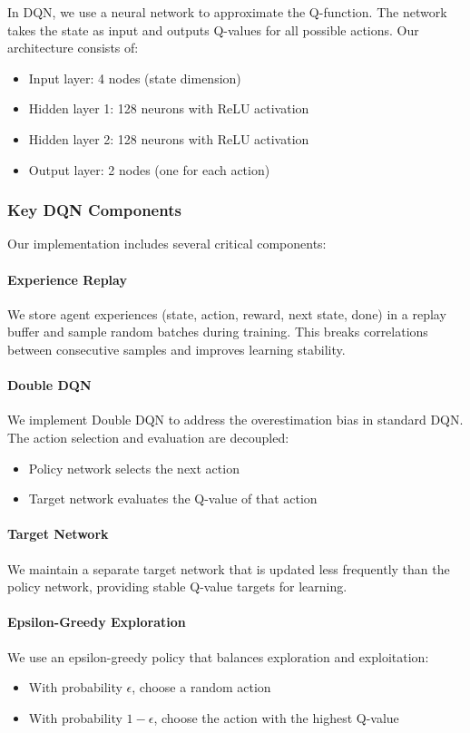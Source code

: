 \documentclass[11pt,a4paper]{article}
\begin{document}
In DQN, we use a neural network to approximate the Q-function. The network takes the state as input and outputs Q-values for all possible actions. Our architecture consists of:

\begin{itemize}
    \item Input layer: 4 nodes (state dimension)
    \item Hidden layer 1: 128 neurons with ReLU activation
    \item Hidden layer 2: 128 neurons with ReLU activation 
    \item Output layer: 2 nodes (one for each action)
\end{itemize}

\subsubsection{Key DQN Components}

Our implementation includes several critical components:

\paragraph{Experience Replay} We store agent experiences (state, action, reward, next state, done) in a replay buffer and sample random batches during training. This breaks correlations between consecutive samples and improves learning stability.

\paragraph{Double DQN} We implement Double DQN to address the overestimation bias in standard DQN. The action selection and evaluation are decoupled:
\begin{itemize}
    \item Policy network selects the next action
    \item Target network evaluates the Q-value of that action
\end{itemize}

\paragraph{Target Network} We maintain a separate target network that is updated less frequently than the policy network, providing stable Q-value targets for learning.

\paragraph{Epsilon-Greedy Exploration} We use an epsilon-greedy policy that balances exploration and exploitation:
\begin{itemize}
    \item With probability $\epsilon$, choose a random action
    \item With probability $1-\epsilon$, choose the action with the highest Q-value
\end{itemize}
\end{document}
